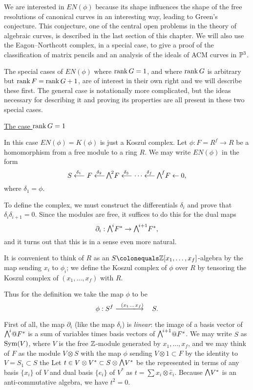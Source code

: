 We
are interested in $EN(\phi)$ because its shape
influences the shape of the free resolutions of canonical curves in an
interesting way,
leading to Green's conjecture. This conjecture, one of the central open
problems in the theory of algebraic curves, is described in the last
section of this chapter. We will also use the Eagon--Northcott
complex, in a special case, to give a proof of the classification of
matrix pencils and an analysis of the ideals of ACM curves in ${\mathbb P}^{3}$.

The special cases of $EN(\phi)$ where $\operatorname{rank} G = 1$, and where
$\operatorname{rank} G$ is arbitrary but $\operatorname{rank} F = \operatorname{rank} G + 1$, are of interest in their
own right and we will describe these first. The general case
is notationally more complicated, but the  ideas necessary for
describing it and proving its properties
 are all
present in these two special cases.

\smallbreak
\noindent
\underline{The case $\operatorname{rank} G = 1$}
\smallbreak

In this case $EN(\phi) = K(\phi)$ is just a
 Koszul complex. Let $\phi:F = R^{f}\to R$ be a homomorphism from
a free module to a ring $R$. We may write $EN(\phi)$ in the form
$$
S \luto{\,\delta_{1}} \!F \luto{\,\delta_{2}}\!\! \mwedge^{2}F
\luto{\,\delta_{3}} \!\cdots \luto{\,\delta_{f}}\!\!\mwedge^{f}F\leftarrow 0, 
$$
where $\delta_{1} = \phi$.

To define the complex, we must construct the differentials $\delta_{i}$
and prove that
$\delta_{i}\delta_{i+1} = 0$. Since the modules are free, it suffices
to do this for the
dual maps
$$
\partial_{i}: \mwedge^{i}F^{*} \to \mwedge^{i+1}F^{*},
$$
and it turns out that this is in a sense even more natural.

It is convenient to think of $R$ as an $S \colonequals  \ZZ[x_{1},\dots,
x_{f}]$-algebra by the map sending
$x_{i}$ to $\phi_{i}$; we  define the Koszul complex of $\phi$ over $R$
%
by tensoring
the Koszul complex of $(x_{1}, \dots, x_{f})$ with $R$.

Thus for the definition we take the map $\phi$ to be
$$
\phi: S^{f}\ruuuto {\ \
(x_{1} \,\dots \, x_{f})
} \hskip0.7em S.
$$

First of all, the map $\partial_{i}$ (like the map $\delta_{i}$) is
\emph{linear}: the image of a basis vector of $\mwedge^{i}@F^{*} $ is a
sum of variables times basis vectors
of $\mwedge^{i+1}@F^{*}$. We may write $S$ as $\operatorname{Sym}(V)$, where $V$ is the
free ${\mathbb Z}$-module generated by $x_{1}, \dots, x_{f}$, and we may think
of $F$ as the module $V\otimes S$ with the map
$\phi$ sending $V\otimes 1\subset F$ by the identity to $V = S_{1}\subset S$
\emdash the 
%
Let $t\in V\otimes V^{*}\subset S\otimes \mwedge \,V^{*}$ be the 
\index{trace}%
represented in terms of any basis $\{x_{i}\}$ of $V$
and dual basis $\{\hat e_{i}\}$ of $V^{*}$ as $t = \sum x_{i}\otimes
\hat e_{i}$. Because $\mwedge \,V^{*}$ is
an anti-commutative algebra, we have $t^{2} = 0$.

